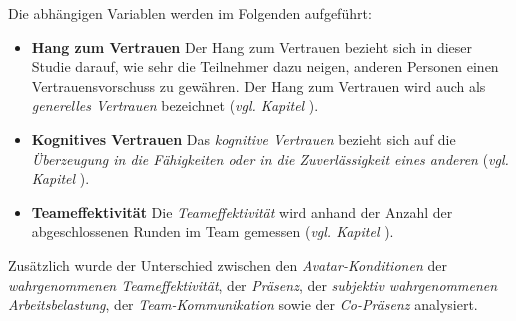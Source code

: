\documentclass[a4paper,11pt]{article}%
\renewcommand{\\}{\vspace*{0.5\baselineskip} \newline}
\begin{document}
Die abhängigen Variablen werden im Folgenden aufgeführt:
\begin{itemize}
\item \textbf{Hang zum Vertrauen} Der Hang zum Vertrauen bezieht sich in dieser Studie darauf, wie sehr die Teilnehmer dazu neigen, anderen Personen einen Vertrauensvorschuss zu gewähren. Der Hang zum Vertrauen wird auch als \textit{generelles Vertrauen} bezeichnet \citep[S. 30]{mcallister1995affect} (\textit{vgl. Kapitel }).
\item \textbf{Kognitives Vertrauen} Das \textit{kognitive Vertrauen} bezieht sich auf die \textit{Überzeugung in die Fähigkeiten oder in die Zuverlässigkeit eines anderen} \citep[S. 30]{mcallister1995affect} (\textit{vgl. Kapitel }).
\item \textbf{Teameffektivität} Die \textit{Teameffektivität} wird anhand der Anzahl der abgeschlossenen Runden im Team gemessen (\textit{vgl. Kapitel }).
\end{itemize}

Zusätzlich wurde der Unterschied zwischen den \textit{Avatar-Konditionen} der \textit{wahrgenommenen Teameffektivität}, der \textit{Präsenz}, der \textit{subjektiv wahrgenommenen Arbeitsbelastung}, der \textit{Team-Kommunikation} sowie der \textit{Co-Präsenz} analysiert.
				
\end{document}
